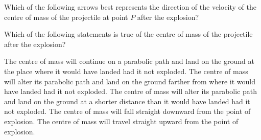 \documentclass{../../../oss-apphys-exam}
\begin{document}
\begin{questions}

  \question Which of the following arrows best represents the direction of the
  velocity of the centre of mass of the projectile at point $P$ after the
  explosion?
  \label{cm1}
  \begin{choices}
    \choice{\huge$\leftarrow$}
    \choice{\huge$\swarrow$}
    \choice{\huge$\searrow$}
    \choice{\huge$\rightarrow$}
    \choice{\huge$\nearrow$}
  \end{choices}
    
  \question Which of the following statements is true of the centre of mass of
  the projectile after the explosion?
  \label{cm2}
  \begin{choices}
    \choice The centre of mass will continue on a parabolic path and land on
    the ground at the place where it would have landed had it not exploded.
    \choice The centre of mass will alter its parabolic path and land on the
    ground farther from where it would have landed had it not exploded.
    \choice The centre of mass will alter its parabolic path and land on the
    ground at a shorter distance than it would have landed had it not
    exploded.
    \choice The centre of mass will fall straight downward from the point of
    explosion.
    \choice The centre of mass will travel straight upward from the point of
    explosion.
  \end{choices}
    

\end{questions}
\end{document}
